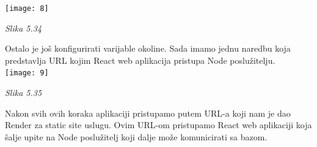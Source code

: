 \documentclass{article}
\begin{document}
		\texttt{[image: 8]}
	\begin{center}
		\textit{Slika 5.34}
	\end{center}
	
	
	Ostalo je još konfigurirati varijable okoline. Sada imamo jednu naredbu koja predstavlja URL kojim React web aplikacija pristupa Node poslužitelju. \\
	
	\texttt{[image: 9]}
	\begin{center}
		\textit{Slika 5.35}
	\end{center}

	
	Nakon svih ovih koraka aplikaciji pristupamo putem URL-a koji nam je dao Render za static site uslugu. Ovim URL-om pristupamo React web aplikaciji koja šalje upite na Node poslužitelj koji dalje može komunicirati sa bazom. 
	\eject
	
	
	
\end{document}
